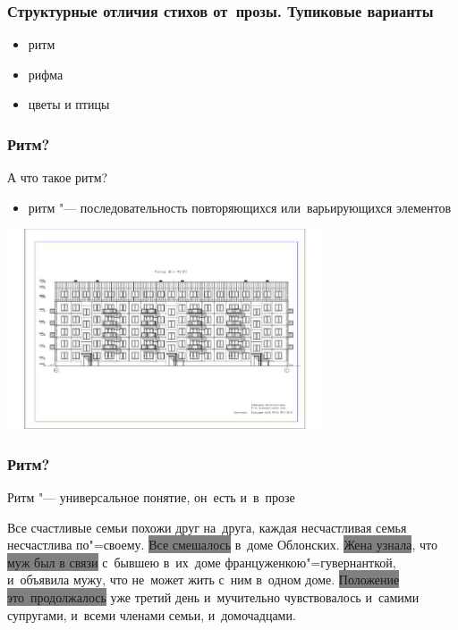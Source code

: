 \documentclass{beamer}
\begin{document}
\begin{frame}
\frametitle{Структурные отличия стихов от~прозы. Тупиковые варианты}

\begin{itemize}
\item ритм
\item рифма
\item цветы и птицы
\end{itemize}

\end{frame}


\begin{frame}
\frametitle{Ритм?}

А что такое ритм?
\begin{itemize}
\item ритм "--- последовательность повторяющихся или~варьирующихся элементов
\end{itemize}

\begin{center}
\includegraphics[width=0.7\textwidth]{building.png}
\end{center}

\end{frame}


\begin{frame}
\frametitle{Ритм?}

Ритм "--- универсальное понятие, он~есть и~в~прозе

 Все \color{blue}счастливые семьи \color{black}похожи друг на~друга, каждая \color{blue}несчастливая семья \color{black}несчастлива по"=своему.
   \colorbox{gray}{Все смешалось} в~доме Облонских. \colorbox{gray}{Жена узнала}, что \colorbox{gray}{муж был в связи} с~бывшею в~их~доме француженкою"=гувернанткой, и~объявила мужу, что не~может жить с~ним в~одном доме. \colorbox{gray}{Положение это~продолжалось} уже третий день и~мучительно чувствовалось и~самими супругами, и~всеми членами семьи, и~домочадцами.

\end{frame}
\end{document}
